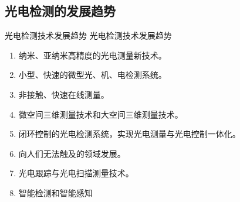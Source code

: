 \documentclass[10pt]{beamer}
\begin{document}





\subsection{光电检测的发展趋势}
\begin{frame}{光电检测技术发展趋势}
光电检测技术发展趋势
    \begin{enumerate}[(1)]
    \item<2-| alert@2>纳米、亚纳米高精度的光电测量新技术。
    \item<2-| alert@3>小型、快速的微型光、机、电检测系统。
    \item<2-| alert@4>非接触、快速在线测量。
    \item<2-| alert@5> 微空间三维测量技术和大空间三维测量技术。
    \item<2-| alert@6> 闭环控制的光电检测系统，实现光电测量与光电控制一体化。
    \item<2-| alert@7> 向人们无法触及的领域发展。
    \item<2-| alert@8> 光电跟踪与光电扫描测量技术。
    \item<2-| alert@9> 智能检测和智能感知
    \end{enumerate}
\end{frame}
\end{document}
